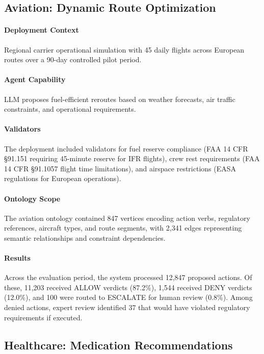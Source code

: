 \documentclass[sigconf,nonacm]{acmart}
\begin{document}
\subsection{Aviation: Dynamic Route Optimization}

\paragraph{Deployment Context} Regional carrier operational simulation with 45 daily flights across European routes over a 90-day controlled pilot period.

\paragraph{Agent Capability} LLM proposes fuel-efficient reroutes based on weather forecasts, air traffic constraints, and operational requirements.

\paragraph{Validators} The deployment included validators for fuel reserve compliance (FAA 14 CFR \S91.151 requiring 45-minute reserve for IFR flights), crew rest requirements (FAA 14 CFR \S91.1057 flight time limitations), and airspace restrictions (EASA regulations for European operations).

\paragraph{Ontology Scope} The aviation ontology contained 847 vertices encoding action verbs, regulatory references, aircraft types, and route segments, with 2,341 edges representing semantic relationships and constraint dependencies.

\paragraph{Results} Across the evaluation period, the system processed 12,847 proposed actions. Of these, 11,203 received ALLOW verdicts (87.2\%), 1,544 received DENY verdicts (12.0\%), and 100 were routed to ESCALATE for human review (0.8\%). Among denied actions, expert review identified 37 that would have violated regulatory requirements if executed.

\subsection{Healthcare: Medication Recommendations}
\end{document}
